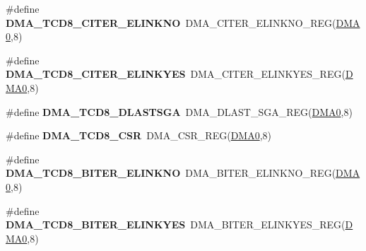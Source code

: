 \begin{DoxyCompactItemize}
\item 
\#define {\bfseries D\+M\+A\+\_\+\+T\+C\+D8\+\_\+\+C\+I\+T\+E\+R\+\_\+\+E\+L\+I\+N\+K\+NO}~D\+M\+A\+\_\+\+C\+I\+T\+E\+R\+\_\+\+E\+L\+I\+N\+K\+N\+O\+\_\+\+R\+EG(\hyperlink{group__DMA__Peripheral__Access__Layer_ga4103044f9ca209772f513dc694513ffb}{D\+M\+A0},8)\hypertarget{group__DMA__Register__Accessor__Macros_ga6da76173da694902dd5e5974ed7f9efd}{}\label{group__DMA__Register__Accessor__Macros_ga6da76173da694902dd5e5974ed7f9efd}

\item 
\#define {\bfseries D\+M\+A\+\_\+\+T\+C\+D8\+\_\+\+C\+I\+T\+E\+R\+\_\+\+E\+L\+I\+N\+K\+Y\+ES}~D\+M\+A\+\_\+\+C\+I\+T\+E\+R\+\_\+\+E\+L\+I\+N\+K\+Y\+E\+S\+\_\+\+R\+EG(\hyperlink{group__DMA__Peripheral__Access__Layer_ga4103044f9ca209772f513dc694513ffb}{D\+M\+A0},8)\hypertarget{group__DMA__Register__Accessor__Macros_gae6a4aaa8869815edf82c900a92bdfe92}{}\label{group__DMA__Register__Accessor__Macros_gae6a4aaa8869815edf82c900a92bdfe92}

\item 
\#define {\bfseries D\+M\+A\+\_\+\+T\+C\+D8\+\_\+\+D\+L\+A\+S\+T\+S\+GA}~D\+M\+A\+\_\+\+D\+L\+A\+S\+T\+\_\+\+S\+G\+A\+\_\+\+R\+EG(\hyperlink{group__DMA__Peripheral__Access__Layer_ga4103044f9ca209772f513dc694513ffb}{D\+M\+A0},8)\hypertarget{group__DMA__Register__Accessor__Macros_ga1337c2ad5e7240758afd7abec5e06af4}{}\label{group__DMA__Register__Accessor__Macros_ga1337c2ad5e7240758afd7abec5e06af4}

\item 
\#define {\bfseries D\+M\+A\+\_\+\+T\+C\+D8\+\_\+\+C\+SR}~D\+M\+A\+\_\+\+C\+S\+R\+\_\+\+R\+EG(\hyperlink{group__DMA__Peripheral__Access__Layer_ga4103044f9ca209772f513dc694513ffb}{D\+M\+A0},8)\hypertarget{group__DMA__Register__Accessor__Macros_ga803ebab170f7e3a1979cb7e9a58d3f1c}{}\label{group__DMA__Register__Accessor__Macros_ga803ebab170f7e3a1979cb7e9a58d3f1c}

\item 
\#define {\bfseries D\+M\+A\+\_\+\+T\+C\+D8\+\_\+\+B\+I\+T\+E\+R\+\_\+\+E\+L\+I\+N\+K\+NO}~D\+M\+A\+\_\+\+B\+I\+T\+E\+R\+\_\+\+E\+L\+I\+N\+K\+N\+O\+\_\+\+R\+EG(\hyperlink{group__DMA__Peripheral__Access__Layer_ga4103044f9ca209772f513dc694513ffb}{D\+M\+A0},8)\hypertarget{group__DMA__Register__Accessor__Macros_ga4d20f91416d78e491c9f030b53cc7bcf}{}\label{group__DMA__Register__Accessor__Macros_ga4d20f91416d78e491c9f030b53cc7bcf}

\item 
\#define {\bfseries D\+M\+A\+\_\+\+T\+C\+D8\+\_\+\+B\+I\+T\+E\+R\+\_\+\+E\+L\+I\+N\+K\+Y\+ES}~D\+M\+A\+\_\+\+B\+I\+T\+E\+R\+\_\+\+E\+L\+I\+N\+K\+Y\+E\+S\+\_\+\+R\+EG(\hyperlink{group__DMA__Peripheral__Access__Layer_ga4103044f9ca209772f513dc694513ffb}{D\+M\+A0},8)\hypertarget{group__DMA__Register__Accessor__Macros_gad040442b5582baa8e415dd881c0ad939}{}\label{group__DMA__Register__Accessor__Macros_gad040442b5582baa8e415dd881c0ad939}


\end{DoxyCompactItemize}
